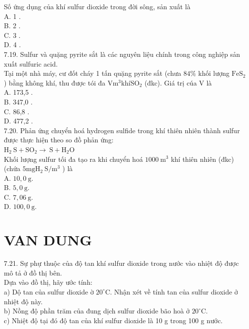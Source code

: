 \documentclass[10pt]{article}
\begin{document}
Số ứng dụng của khí sulfur dioxide trong đời sông, sản xuất là\\
A. 1 .\\
B. 2 .\\
C. 3 .\\
D. 4 .\\
7.19. Sulfur và quặng pyrite sắt là các nguyên liệu chính trong công nghiệp sản xuất sulfuric acid.\\
Tại một nhà máy, cư đốt cháy 1 tấn quặng pyrite sắt (chưa $84 \%$ khối lượng $\mathrm{FeS}_{2}$ ) bằng không khí, thu được tói đa $\mathrm{V} \mathrm{m}^{3} \mathrm{khí} \mathrm{SO}_{2}$ (đkc). Giá trị cúa V là\\
A. 173,5 .\\
B. 347,0 .\\
C. 86,8 .\\
D. 477,2 .\\
7.20. Phản ứng chuyển hoá hydrogen sulfide trong khí thiên nhiên thành sulfur được thực hiện theo so đồ phản ứng:\\
$\mathrm{H}_{2} \mathrm{~S}+\mathrm{SO}_{2} \longrightarrow \mathrm{~S}+\mathrm{H}_{2} \mathrm{O}$\\
Khối lượng sulfur tối đa tạo ra khi chuyển hoá $1000 \mathrm{~m}^{3}$ khí thiên nhiên (đkc) (chứa $5 \mathrm{mg} \mathrm{H}_{2} \mathrm{~S} / \mathrm{m}^{3}$ ) là\\
A. $10,0 \mathrm{~g}$.\\
B. $5,0 \mathrm{~g}$.\\
C. $7,06 \mathrm{~g}$.\\
D. $100,0 \mathrm{~g}$.

\section*{VAN DUNG}
7.21. Sự phự thuộc của độ tan khí sulfur dioxide trong nước vào nhiệt độ được mô tả ở đồ thị bên.\\
Dựa vào đồ thị, hãy ước tính:\\
a) Dộ tan của sulfur dioxide ờ $20^{\circ} \mathrm{C}$. Nhận xét về tính tan của sulfur dioxide ở nhiệt độ này.\\
b) Nồng độ phần trăm của đung dịch sulfur dioxide bão hoà ở $20^{\circ} \mathrm{C}$.\\
c) Nhiệt độ tại đó độ tan của khí sulfur dioxide là 10 g trong 100 g nước.
\end{document}
